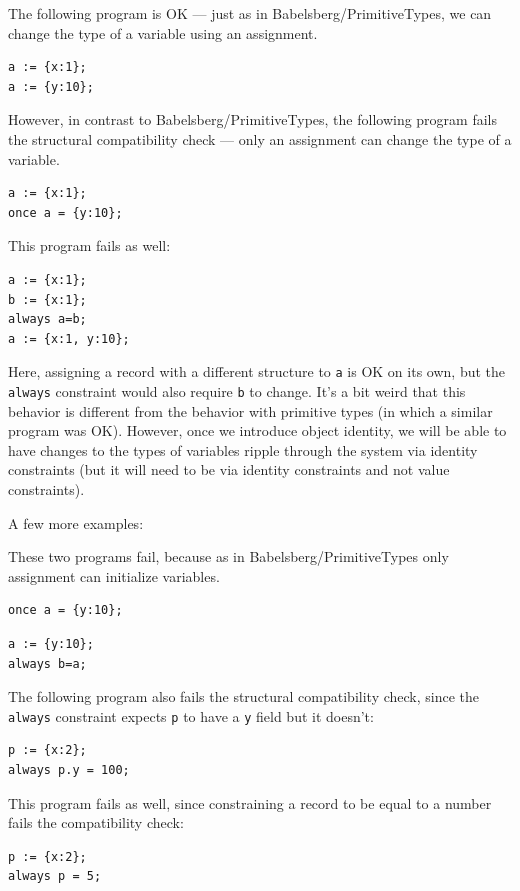 \documentclass{article}
\begin{document}
The following program is OK --- just as in Babelsberg/PrimitiveTypes,
we can change the type of a variable using an assignment.

\begin{verbatim}
a := {x:1};
a := {y:10};
\end{verbatim}

However, in contrast to Babelsberg/PrimitiveTypes, the following
program fails the structural compatibility check --- only an
assignment can change the type of a variable.

\begin{verbatim}
a := {x:1};
once a = {y:10};
\end{verbatim}

This program fails as well:
\begin{verbatim}
a := {x:1};
b := {x:1};
always a=b;
a := {x:1, y:10};
\end{verbatim}
Here, assigning a record with a different structure to \verb|a| is OK on its
own, but the \verb|always| constraint would also require \verb|b| to
change.  It's a bit weird that this behavior is different from the
behavior with primitive types (in which a similar program was OK).
However, once we introduce object identity, we will be able to have
changes to the types of variables ripple through the system via
identity constraints (but it will need to be via identity constraints
and not value constraints).

A few more examples:

These two programs fail, because as in Babelsberg/PrimitiveTypes only
assignment can initialize variables.
\begin{verbatim}
once a = {y:10};
\end{verbatim}

\begin{verbatim}
a := {y:10};
always b=a;
\end{verbatim}

The following program also fails the structural compatibility check, since
the \verb|always| constraint expects \verb|p| to have a \verb|y| field
but it doesn't:
\begin{verbatim}
p := {x:2};
always p.y = 100;
\end{verbatim}

This program fails as well, since constraining a record to be equal to
a number fails the compatibility check:
\begin{verbatim}
p := {x:2};
always p = 5;
\end{verbatim}
\end{document}
